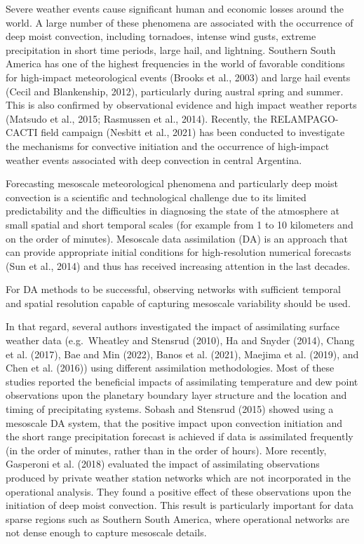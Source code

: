 \documentclass[authoryear,preprint,review,12pt]{elsarticle} %
\begin{document}
Severe weather events cause significant human and economic losses around the world. A large number of these phenomena are associated with the occurrence of deep moist convection, including tornadoes, intense wind gusts, extreme precipitation in short time periods, large hail, and lightning.
Southern South America has one of the highest frequencies in the world of favorable conditions for high-impact meteorological events (Brooks et al., 2003) and large hail events (Cecil and Blankenship, 2012), particularly during austral spring and summer.
This is also confirmed by observational evidence and high impact weather reports (Matsudo et al., 2015; Rasmussen et al., 2014). Recently, the RELAMPAGO-CACTI field campaign (Nesbitt et al., 2021) has been conducted to investigate the mechanisms for convective initiation and the occurrence of high-impact weather events associated with deep convection in central Argentina.

Forecasting mesoscale meteorological phenomena and particularly deep moist convection is a scientific and technological challenge due to its limited predictability and the difficulties in diagnosing the state of the atmosphere at small spatial and short temporal scales (for example from 1 to 10 kilometers and on the order of minutes). Mesoscale data assimilation (DA) is an approach that can provide appropriate initial conditions for high-resolution numerical forecasts (Sun et al., 2014) and thus has received increasing attention in the last decades.

For DA methods to be successful, observing networks with sufficient temporal and spatial resolution capable of capturing mesoscale variability should be used.

In that regard, several authors investigated the impact of assimilating surface weather data (e.g.~Wheatley and Stensrud (2010), Ha and Snyder (2014), Chang et al. (2017), Bae and Min (2022), Banos et al. (2021), Maejima et al. (2019), and Chen et al. (2016)) using different assimilation methodologies. Most of these studies reported the beneficial impacts of assimilating temperature and dew point observations upon the planetary boundary layer structure and the location and timing of precipitating systems. Sobash and Stensrud (2015) showed using a mesoscale DA system, that the positive impact upon convection initiation and the short range precipitation forecast is achieved if data is assimilated frequently (in the order of minutes, rather than in the order of hours). More recently, Gasperoni et al. (2018) evaluated the impact of assimilating observations produced by private weather station networks which are not incorporated in the operational analysis. They found a positive effect of these observations upon the initiation of deep moist convection. This result is particularly important for data sparse regions such as Southern South America, where operational networks are not dense enough to capture mesoscale details.
\end{document}
